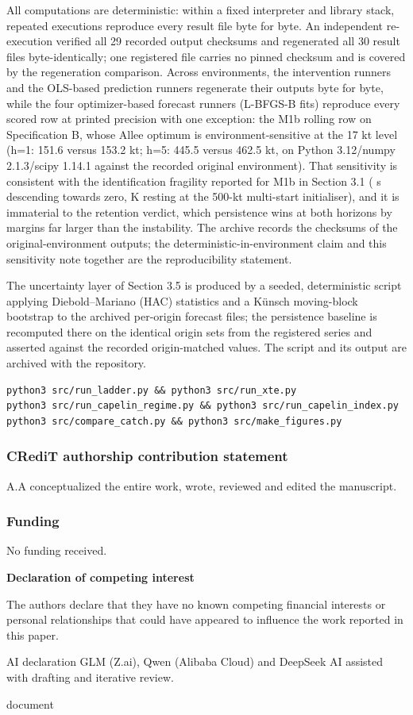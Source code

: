 \documentclass[11pt]{article}
\begin{document}
All computations are deterministic: within a fixed interpreter and
library stack, repeated executions reproduce every result file byte for
byte. An independent re-execution verified all 29 recorded output
checksums and regenerated all 30 result files byte-identically; one
registered file carries no pinned checksum and is covered by the
regeneration comparison. Across environments, the intervention runners
and the OLS-based prediction runners regenerate their outputs byte for
byte, while the four optimizer-based forecast runners (L-BFGS-B fits)
reproduce every scored row at printed precision with one exception: the
M1b rolling row on Specification B, whose Allee optimum is
environment-sensitive at the 17 kt level (h=1: 151.6 versus 153.2 kt;
h=5: 445.5 versus 462.5 kt, on Python 3.12/numpy 2.1.3/scipy 1.14.1
against the recorded original environment). That sensitivity is
consistent with the identification fragility reported for M1b in Section
3.1 ( s descending towards zero, K resting at the 500-kt multi-start
initialiser), and it is immaterial to the retention verdict, which
persistence wins at both horizons by margins far larger than the
instability. The archive records the checksums of the
original-environment outputs; the deterministic-in-environment claim and
this sensitivity note together are the reproducibility statement.

The uncertainty layer of Section 3.5 is produced by a seeded,
deterministic script applying Diebold--Mariano (HAC) statistics and a
Künsch moving-block bootstrap to the archived per-origin forecast files;
the persistence baseline is recomputed there on the identical origin
sets from the registered series and asserted against the recorded
origin-matched values. The script and its output are archived with the
repository.

\begin{verbatim}
python3 src/run_ladder.py && python3 src/run_xte.py
python3 src/run_capelin_regime.py && python3 src/run_capelin_index.py
python3 src/compare_catch.py && python3 src/make_figures.py
\end{verbatim}

\subsubsection{CRediT authorship contribution
statement}\label{credit-authorship-contribution-statement}

A.A conceptualized the entire work, wrote, reviewed and edited the
manuscript.

\subsubsection{Funding}\label{funding}

No funding received.

\textbf{Declaration of competing interest}

The authors declare that they have no known competing financial
interests or personal relationships that could have appeared to
influence the work reported in this paper.

AI declaration GLM (Z.ai), Qwen (Alibaba Cloud) and DeepSeek AI assisted
with drafting and iterative review.

document
\end{document}
